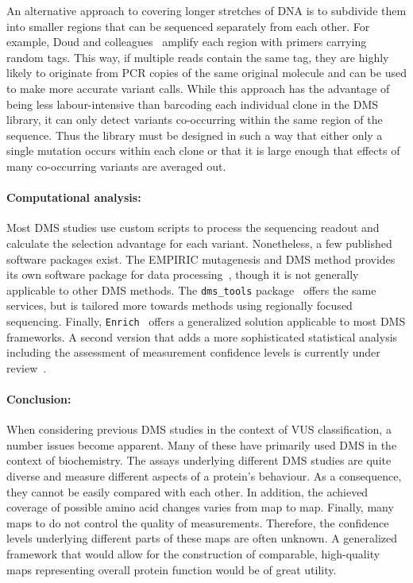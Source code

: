 An alternative approach to covering longer stretches of DNA is to subdivide them into smaller regions that can be sequenced separately from each other. For example, Doud and colleagues~\cite{doud_accurate_2016} amplify each region with primers carrying random tags. This way, if multiple reads contain the same tag, they are highly likely to originate from PCR copies of the same original molecule and can be used to make more accurate variant calls. While this approach has the advantage of being less labour-intensive than barcoding each individual clone in the DMS library, it can only detect variants co-occurring within the same region of the sequence. Thus the library must be designed in such a way that either only a single mutation occurs within each clone or that it is large enough that effects of many co-occurring variants are averaged out.

\paragraph{Computational analysis:} Most DMS studies use custom scripts to process the sequencing readout and calculate the selection advantage for each variant. Nonetheless, a few published software packages exist. The EMPIRIC mutagenesis and DMS method provides its own software package for data processing~\cite{hietpas_experimental_2011}, though it is not generally applicable to other DMS methods. The \texttt{dms\_tools} package~\cite{bloom_software_2015} offers the same services, but is tailored more towards methods using regionally focused sequencing. Finally, \texttt{Enrich}~\cite{fowler_enrich:_2011} offers a generalized solution applicable to most DMS frameworks. A second version that adds a more sophisticated statistical analysis including the assessment of measurement confidence levels is currently under review~\cite{rubin_enrich2:_2016}.


\paragraph{Conclusion:} When considering previous DMS studies in the context of VUS classification, a number issues become apparent. Many of these have primarily used DMS in the context of biochemistry. The assays underlying different DMS studies are quite diverse and measure different aspects of a protein's behaviour. As a consequence, they cannot be easily compared with each other. In addition, the achieved coverage of possible amino acid changes varies from map to map. Finally, many maps to do not control the quality of measurements. Therefore, the confidence levels underlying different parts of these maps are often unknown. A generalized framework that would allow for the construction of comparable, high-quality maps representing overall protein function would be of great utility.


